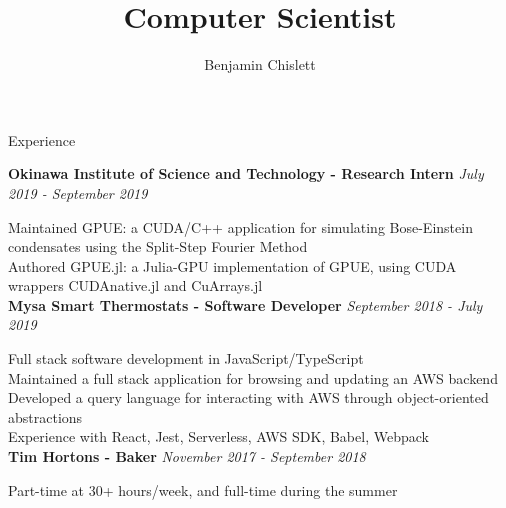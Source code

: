 \documentclass[11pt, letterpaper]{article}
\title{Computer Scientist}
\author{Benjamin Chislett}
\date{}
\begin{document}
\begin{center}
  \Huge\theauthor
  \par
  \huge\thetitle
  \par
\end{center}

\begin{section}{Experience}

\textbf{Okinawa Institute of Science and Technology - Research Intern}
\hfill
\textit{July 2019 - September 2019}

Maintained GPUE: a CUDA/C++ application for simulating Bose-Einstein condensates using the Split-Step Fourier Method\\
Authored GPUE.jl: a Julia-GPU implementation of GPUE, using CUDA wrappers CUDAnative.jl and CuArrays.jl\\

\textbf{Mysa Smart Thermostats - Software Developer}
\hfill
\textit{September 2018 - July 2019}

Full stack software development in JavaScript/TypeScript\\
Maintained a full stack application for browsing and updating an AWS backend\\
Developed a query language for interacting with AWS through object-oriented abstractions\\
Experience with React, Jest, Serverless, AWS SDK, Babel, Webpack\\

\textbf{Tim Hortons - Baker}
\hfill
\textit{November 2017 - September 2018}

Part-time at 30+ hours/week, and full-time during the summer
\end{section}
\end{document}
